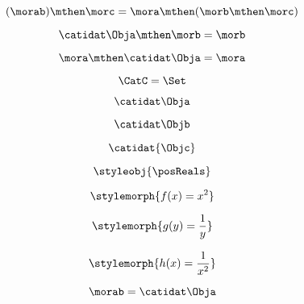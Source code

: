 \begin{forslides}
    \begin{equation}
        \label{eq:semicats-slides-20}
        (\morab)
        \mthen \morc= \mora \mthen (\morb \mthen \morc)
    \end{equation}

    \begin{equation}
        \label{eq:semicats-slides-21}
        \catidat\Obja \mthen \morb = \morb
    \end{equation}

    \begin{equation}
        \label{eq:semicats-slides-22}
        \mora \mthen \catidat\Obja = \mora
    \end{equation}

    \begin{equation}
        \label{eq:semicats-slides-23}
        \CatC = \Set
    \end{equation}

    \begin{equation}
        \label{eq:semicats-slides-24}
        \catidat\Obja
    \end{equation}

    \begin{equation}
        \label{eq:semicats-slides-25}
        \catidat\Objb
    \end{equation}

    \begin{equation}
        \label{eq:semicats-slides-26}
        \catidat{\Objc}
    \end{equation}

    \begin{equation}
        \label{eq:semicats-slides-27}
        \styleobj{\posReals}
    \end{equation}

    \begin{equation}
        \label{eq:semicats-slides-28}
        \stylemorph{f(x) = x^2}
    \end{equation}

    \begin{equation}
        \label{eq:semicats-slides-29}
        \stylemorph{g(y) = \frac{1}{y}}
    \end{equation}

    \begin{equation}
        \label{eq:semicats-slides-30}
        \stylemorph{h(x) = \frac{1}{x^2}}
    \end{equation}

    \begin{equation}
        \label{eq:semicats-slides-31}
        \morab = \catidat\Obja
    \end{equation}


\end{forslides}
